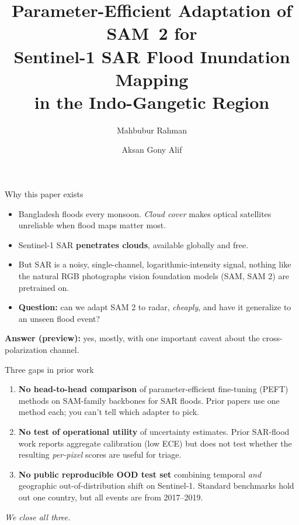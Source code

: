 \documentclass[aspectratio=169,11pt]{beamer}
\title{Parameter-Efficient Adaptation of SAM~2 for\\Sentinel-1 SAR Flood Inundation Mapping\\in the Indo-Gangetic Region}
\author{Mahbubur Rahman \and Aksan Gony Alif}
\institute{BRAC University}
\date{}
\begin{document}

\maketitle

\begin{frame}{Why this paper exists}
\begin{itemize}
    \item Bangladesh floods every monsoon. \emph{Cloud cover} makes optical satellites unreliable when flood maps matter most.
    \item Sentinel-1 SAR \textbf{penetrates clouds}, available globally and free.
    \item But SAR is a noisy, single-channel, logarithmic-intensity signal, nothing like the natural RGB photographs vision foundation models (SAM, SAM 2) are pretrained on.
    \item \textbf{Question:} can we adapt SAM 2 to radar, \emph{cheaply}, and have it generalize to an unseen flood event?
\end{itemize}
\vspace{0.5em}
\textbf{Answer (preview):} yes, mostly, with one important caveat about the cross-polarization channel.
\end{frame}

\begin{frame}{Three gaps in prior work}
\begin{enumerate}
    \item[\textbf{1.}] \textbf{No head-to-head comparison} of parameter-efficient fine-tuning (PEFT) methods on SAM-family backbones for SAR floods. Prior papers use one method each; you can't tell which adapter to pick.
    \vspace{0.5em}
    \item[\textbf{2.}] \textbf{No test of operational utility} of uncertainty estimates. Prior SAR-flood work reports aggregate calibration (low ECE) but does not test whether the resulting \emph{per-pixel} scores are useful for triage.
    \vspace{0.5em}
    \item[\textbf{3.}] \textbf{No public reproducible OOD test set} combining temporal \emph{and} geographic out-of-distribution shift on Sentinel-1. Standard benchmarks hold out one country, but all events are from 2017--2019.
\end{enumerate}
\vspace{0.5em}
\centering
\emph{We close all three.}
\end{frame}
\end{document}
